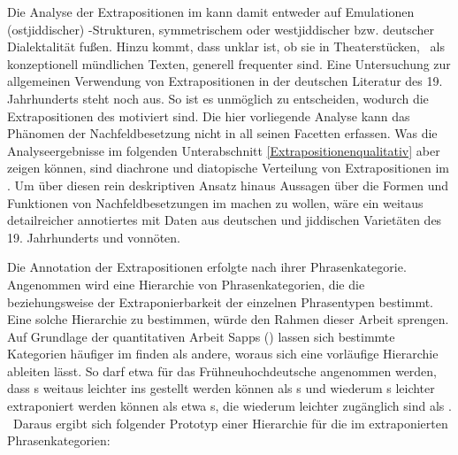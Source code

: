       
   Die Analyse der Extrapositionen im \hai{{\LiJieins}} kann damit entweder auf Emulationen (ostjiddischer) \hai{{\VO}}-Strukturen, symmetrischem  oder westjiddischer bzw. deutscher Dialektalität fußen. Hinzu kommt, dass unklar ist, ob sie in Theaterstücken, \,%
   als konzeptionell mündlichen Texten, generell frequenter sind. Eine Untersuchung zur allgemeinen Verwendung von Extrapositionen in der deutschen Literatur des 19. Jahrhunderts steht noch aus. So ist es unmöglich zu entscheiden, wodurch die Extrapositionen des \hai{{\LiJieins}} motiviert sind. Die hier vorliegende Analyse kann das Phänomen der Nachfeldbesetzung nicht in all seinen Facetten erfassen. Was die Analyseergebnisse im folgenden Unterabschnitt \ref{Extrapositionenqualitativ} aber zeigen können, sind diachrone und diatopische Verteilung von Extrapositionen im \hai{{\LiJi}}. Um über diesen rein deskriptiven Ansatz hinaus Aussagen über die Formen und Funktionen von Nachfeldbesetzungen im \hai{{\LiJi}} machen zu wollen, wäre ein weitaus detailreicher annotiertes  mit Daten aus deutschen und jiddischen Varietäten des 19. Jahrhunderts und \hai{{\LiJi}} vonnöten. 
         
   Die Annotation der Extrapositionen erfolgte nach ihrer Phrasenkategorie. Angenommen wird eine Hierarchie von Phrasenkategorien, die die  
beziehungsweise %
 der Extraponierbarkeit der einzelnen Phrasentypen bestimmt. Eine solche Hierarchie zu bestimmen, würde den Rahmen dieser Arbeit sprengen. Auf Grundlage der quantitativen Arbeit Sapps (\citeyear{Sapp2014}) lassen sich bestimmte Kategorien häufiger im \hai{{\NF}} finden als andere, woraus sich eine vorläufige Hierarchie ableiten lässt. So darf etwa für das Frühneuhochdeutsche angenommen werden, dass \hai{{\PP}}s weitaus leichter ins  gestellt werden können als \hai{{\NP}}s und wiederum \hai{{\NP}}s leichter extraponiert werden können als etwa \hai{{\AP}}s, die wiederum leichter zugänglich sind als \hai{{\AdvP}}. \,%
   Daraus ergibt sich folgender Prototyp einer Hierarchie für die im \hai{{\LiJi}} extraponierten Phrasenkategorien:
   
